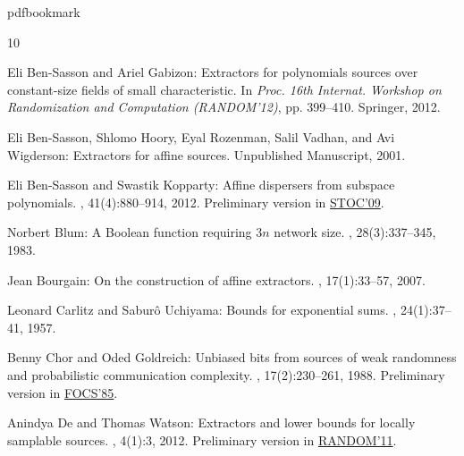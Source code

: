 %
%
%
%
%
\providecommand{\bibhead}[1]{}
%
\expandafter\ifx\csname pdfbookmark\endcsname\relax%
  \providecommand{\tocrefpdfbookmark}{}
\else\providecommand{\tocrefpdfbookmark}{%
   \hypertarget{tocreferences}{}%
   \pdfbookmark[1]{References}{tocreferences}}%
\fi

\tocrefpdfbookmark
\begin{thebibliography}{10}

\bibhead{BG12}
{\sc Eli {Ben-Sasson} and Ariel Gabizon}: Extractors for polynomials sources
  over constant-size fields of small characteristic.
\newblock In {\em Proc. 16th Internat. Workshop on Randomization and
  Computation (RANDOM'12)}, pp. 399--410. Springer, 2012.
\newblock [\epfmtdoi{10.1007/978-3-642-32512-0\_34}]

\bibhead{BHRVW}
{\sc Eli {Ben-Sasson}, Shlomo Hoory, Eyal Rozenman, Salil Vadhan, and Avi
  Wigderson}: Extractors for affine sources.
\newblock Unpublished Manuscript, 2001.

\bibhead{BK09}
{\sc Eli {Ben-Sasson} and Swastik Kopparty}: Affine dispersers from subspace
  polynomials.
, 41(4):880--914, 2012.
\newblock Preliminary version in
  \href{http://dx.doi.org/10.1145/1536414.1536426}{STOC'09}.
\newblock [\epfmtdoi{10.1137/110826254}]

\bibhead{blum}
{\sc Norbert Blum}: A {B}oolean function requiring $3n$ network size.
, 28(3):337--345, 1983.
\newblock [\epfmtdoi{10.1016/0304-3975(83)90029-4}]

\bibhead{Bour05}
{\sc Jean Bourgain}: On the construction of affine extractors.
, 17(1):33--57, 2007.
\newblock [\epfmtdoi{10.1007/s00039-007-0593-z}]

\bibhead{CU57}
{\sc Leonard Carlitz and Sabur{\^o} Uchiyama}: Bounds for exponential sums.
, 24(1):37--41, 1957.
\newblock [\epfmtdoi{10.1215/S0012-7094-57-02406-7}]

\bibhead{CG88}
{\sc Benny Chor and Oded Goldreich}: Unbiased bits from sources of weak
  randomness and probabilistic communication complexity.
, 17(2):230--261, 1988.
\newblock Preliminary version in
  \href{http://dx.doi.org/10.1109/SFCS.1985.62}{FOCS'85}.
\newblock [\epfmtdoi{10.1137/0217015}]

\bibhead{DeW11}
{\sc Anindya De and Thomas Watson}: Extractors and lower bounds for locally
  samplable sources.
, 4(1):3, 2012.
\newblock Preliminary version in
  \href{http://dx.doi.org/10.1007/978-3-642-22935-0_41}{RANDOM'11}.
\newblock [\epfmtdoi{10.1145/2141938.2141941}]


\end{thebibliography}

